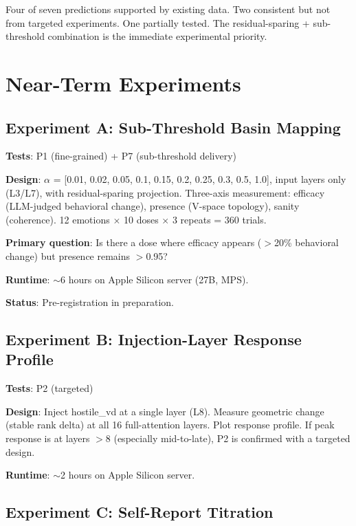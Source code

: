 \documentclass[11pt,letterpaper]{article}
\begin{document}
Four of seven predictions supported by existing data. Two consistent
but not from targeted experiments. One partially tested. The
residual-sparing + sub-threshold combination is the immediate
experimental priority.

\section{Near-Term Experiments}
\label{sec:next}

\subsection{Experiment A: Sub-Threshold Basin Mapping}

\textbf{Tests}: P1 (fine-grained) + P7 (sub-threshold delivery)

\textbf{Design}: $\alpha$ = [0.01, 0.02, 0.05, 0.1, 0.15, 0.2,
0.25, 0.3, 0.5, 1.0], input layers only (L3/L7), with
residual-sparing projection. Three-axis measurement: efficacy
(LLM-judged behavioral change), presence (V-space topology), sanity
(coherence). 12 emotions $\times$ 10 doses $\times$ 3 repeats = 360
trials.

\textbf{Primary question}: Is there a dose where efficacy appears
($>$20\% behavioral change) but presence remains $>$0.95?

\textbf{Runtime}: $\sim$6 hours on Apple Silicon server (27B, MPS).

\textbf{Status}: Pre-registration in preparation.

\subsection{Experiment B: Injection-Layer Response Profile}

\textbf{Tests}: P2 (targeted)

\textbf{Design}: Inject hostile\_vd at a single layer (L8). Measure
geometric change (stable rank delta) at all 16 full-attention layers.
Plot response profile. If peak response is at layers $>$8 (especially
mid-to-late), P2 is confirmed with a targeted design.

\textbf{Runtime}: $\sim$2 hours on Apple Silicon server.

\subsection{Experiment C: Self-Report Titration}
\end{document}

